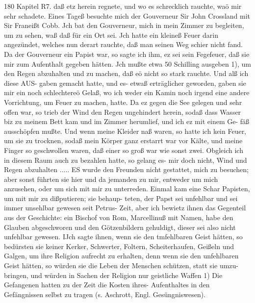 180 Kapitel R7.
daß etz herein regnete, und wo es schrecklich rauchte, waö mir
sehr schadete. Eines Tageß besuchte mich der Gouverneur Sir
John Crossland mit Sir Franeißt Cobb. Jch bat den Gouverneur,
mich in mein Zimmer zu begleiten, um zu sehen, waß daß für
ein Ort sei. Jch hatte ein kleineß Feuer darin angezündet, welches
nun derart rauchte, daß man seinen Weg schier nicht fand. Da
der Gouverneur ein Papist war, so sagte ich ihm, ez sei sein
Fegefeuer, daß sie mir zum Aufenthalt gegeben hätten. Jch mußte
etwa 50 Schilling ausgeben 1), um den Regen abzuhalten und zu
machen, daß eö nicht so stark rauchte. Und alß ich diese AUS-
gaben gemacht hatte, und es- etwaß erträglicher geworden, gaben
sie mir ein noch schlechtereö Gelaß, wo ich weder ein Kamin noch
irgend eine andere Vorrichtung, um Feuer zu machen, hatte. Da
ez gegen die See gelegen und sehr offen war, so trieb der Wind
den Regen ungehindert herein, sodaß dass Wasser biz zu meinem
Bett kam und im Zimmer herumlief, und ich ez mit einem Ge-
fäß ausschöpfen mußte. Und wenn meine Kleider naß waren, so
hatte ich kein Feuer, um sie zu trocknen, sodaß mein Körper ganz
erstarrt war vor Kälte, und meine Finger so geschwollen waren,
daß einer so groß war wie sonst zwei. Obgleich ich in diesem
Raum auch zu bezahlen hatte, so gelang es- mir doch nicht, Wind
und Regen abzuhalten .....
ES wurde den Freunden nicht gestattet, mich zu besuchen;
aber sonst führten sie hier und da jemanden zu mir, entweder
um mich anzusehen, oder um sich mit mir zu unterreden. Einmal
kam eine Schar Papisten, um mit mir zu dißputieren; sie behaup-
teten, der Papst sei unfehlbar und sei immer unsehlbar gewesen
seit Petrus- Zeit, aber ich bewietz ihnen das Gegenteil aus der
Geschichte: ein Bischof von Rom, Marcellinuß mit Namen, habe
den Glauben abgeschworen und den Götzenbildern gehuldigt, dieser
sei also nicht unfehlbar gewesen. IJch sagte ihnen, wenn sie den
tmfehlbaren Geist hätten, so bedürsten sie keiner Kerker, Schwerter,
Foltern, Scheiterhaufen, Geißeln und Galgen, um ihre Religion
aufrecht zu erhalten, denn wenn sie den unfehlbaren Geist hätten,
so würden sie die Leben der Menschen schützen, statt sie umzu-
bringen, und würden in Sachen der Religion nur geistliche Waffen
1) Die Gefangenen hatten zu der Zeit die Kosten ihres- Aufenthaltes in
den Gefängnissen selbst zu tragen (s. Aschrott, Engl. Gesüngniswesen).



